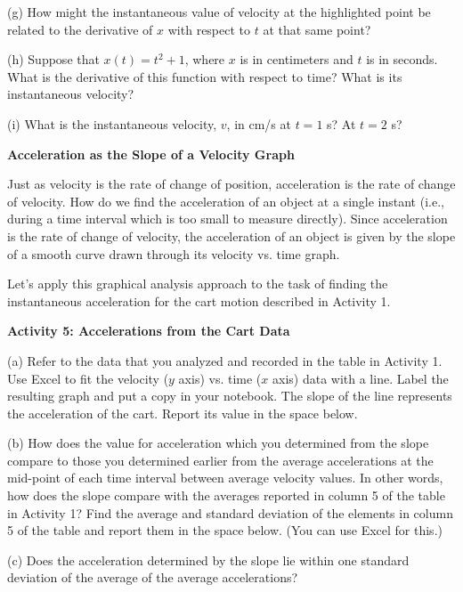 (g) How might the instantaneous value of velocity at the highlighted point be
related to the derivative of $x$ with respect to $t$ at that same point?
\vspace{20mm}

(h) Suppose that $x(t) = t^{2} + 1$, where $x$ is in centimeters and $t$ is
in seconds. What is the derivative of this function with respect to time? What
is its instantaneous velocity?
\vspace{20mm}

(i) What is the instantaneous velocity, $v$, in cm/s at $t = 1$ s? At 
$t = 2$ s?
\answerspace{20mm}

\pagebreak[2]
\textbf{Acceleration as the Slope of a Velocity Graph} 

Just as velocity is the rate of change of position, acceleration is the rate
of change of velocity. How do we find the acceleration of an object at a single
instant (i.e., during a time interval which is too small to measure directly).
Since acceleration is the rate of change of velocity, the acceleration of an
object is given by the slope of a smooth curve drawn through its velocity vs.
time graph.

Let's apply this graphical analysis approach to the task of finding the instantaneous
acceleration for the cart motion described in Activity 1.

\textbf{Activity 5: Accelerations from the Cart Data }

(a) Refer to the data that you analyzed and recorded in the table in Activity
1. Use Excel to fit the velocity ($y$ axis) vs. time ($x$ axis) data with
a line. Label the resulting graph and put a copy in your notebook. The slope
of the line represents the acceleration of the cart. Report its value in the
space below.
\vspace{10mm}

(b) How does the value for acceleration which you determined from the slope
compare to those you determined earlier from the average accelerations at the
mid-point of each time interval between average velocity values. In other words,
how does the slope compare with the averages reported in column 5 of the table
in Activity 1? Find the average and standard deviation of the elements in column
5 of the table and report them in the space below. (You can use Excel
for this.)
\vspace{20mm}

(c) Does the acceleration determined by the slope lie within one standard deviation
of the average of the average accelerations? 

